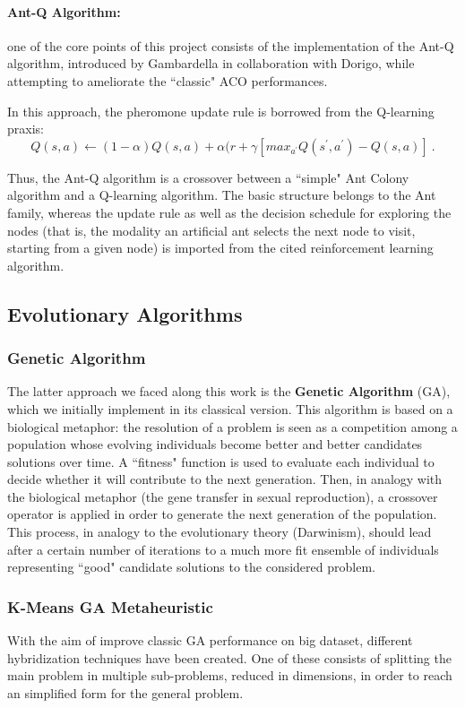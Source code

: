 \documentclass[10pt]{article}
\begin{document}
\paragraph{Ant-Q Algorithm:}
one of the core points of this project consists of the implementation of the Ant-Q algorithm, introduced by Gambardella in collaboration with Dorigo\cite{undici}, while attempting to ameliorate the ``classic" ACO performances.  

In this approach, the pheromone update rule is borrowed from the Q-learning praxis:
\begin{equation}
Q(s,a) \leftarrow (1-\alpha) Q(s,a) + \alpha (r + \gamma [max_{a^{'}} Q(s^{'},a^{'})-Q(s,a)]~.
\label{eq:q-eq}
\end{equation}

Thus, the Ant-Q algorithm is a crossover between a ``simple" Ant Colony algorithm and a Q-learning algorithm. 
The basic structure belongs to the Ant family, whereas the update rule as well as the decision schedule for exploring the nodes (that is, the modality an artificial ant selects the next node to visit, starting from a given node) is imported from the cited reinforcement learning algorithm.
\subsection{Evolutionary Algorithms}
\subsubsection{Genetic Algorithm} \label{sec:gen_alg}
The latter approach we faced along this work is the \textbf{Genetic Algorithm} (GA), which we initially implement in its classical version.
This algorithm is based on a biological metaphor: the resolution of a problem is seen as a competition among a population whose evolving individuals become better and better candidates solutions over time. 
A ``fitness" function is used to evaluate each individual to decide whether it will contribute to the next
generation. 
Then, in analogy with the biological metaphor (the gene transfer in sexual reproduction), a crossover operator is applied in order to generate the next generation of the population.
This process, in analogy to the evolutionary theory (Darwinism), should lead after a certain number of iterations to a much more fit ensemble of individuals representing ``good" candidate solutions to the considered problem.

\subsubsection{K-Means GA Metaheuristic} \label{sec:KGA}
With the aim of improve classic GA performance on big dataset, different hybridization techniques have been created.
One of these consists of splitting the main problem in multiple sub-problems, reduced in dimensions, in order to reach an simplified form for the general problem.
\end{document}
